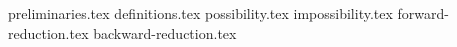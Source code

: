 
{preliminaries.tex}
{definitions.tex}
{possibility.tex}
{impossibility.tex}
{forward-reduction.tex}
{backward-reduction.tex}
